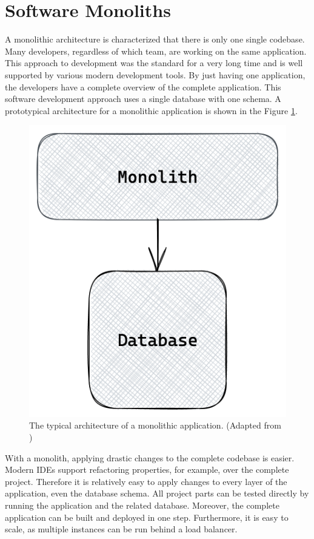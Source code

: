 \section{Software Monoliths}\label{section:background:software-monolith}

A monolithic architecture is characterized that there is only one single codebase. Many developers, regardless of which team, are working on the same application. This approach to development was the standard for a very long time and is well supported by various modern development tools. By just having one application, the developers have a complete overview of the complete application. This software development approach uses a single database with one schema. A prototypical architecture for a monolithic application is shown in the Figure \ref{fig:background:monolith:monolith-sketch}.

\ifshowImages
\begin{figure}[H]
    \centering
    \includegraphics[width=0.3\linewidth]{images/background/monolith/monolith-sketch.png}
    \caption{The typical architecture of a monolithic application. (Adapted from \cite[12]{book:2019:newman:background:monolith:monolith-to-microservices})}\label{fig:background:monolith:monolith-sketch}
\end{figure}
\fi

\bigskip

\noindent With a monolith, applying drastic changes to the complete codebase is easier. Modern \acp{IDE} support refactoring properties, for example, over the complete project. Therefore it is relatively easy to apply changes to every layer of the application, even the database schema. All project parts can be tested directly by running the application and the related database. Moreover, the complete application can be built and deployed in one step. Furthermore, it is easy to scale, as multiple instances can be run behind a load balancer. \cite[4]{book:2018:richardson:background:bff:microservices-patterns}

\bigskip

